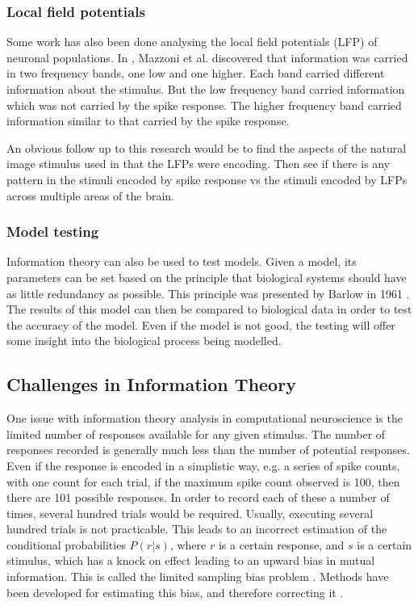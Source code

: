 \documentclass[a4paper,12pt]{article}
\theoremstyle{definition}
\begin{document}
\subsubsection*{Local field potentials}
 Some work has also been done analysing the local field potentials (LFP) of neuronal populations. In \cite{lfps}, Mazzoni et al. discovered that information was carried in two frequency bands, one low and one higher. Each band carried different information about the stimulus. But the low frequency band carried information which was not carried by the spike response. The higher frequency band carried information similar to that carried by the spike response.

 An obvious follow up to this research would be to find the aspects of the natural image stimulus used in \cite{lfps} that the LFPs were encoding. Then see if there is any pattern in the stimuli encoded by spike response vs the stimuli encoded by LFPs across multiple areas of the brain.

\subsubsection*{Model testing}
 Information theory can also be used to test models. Given a model, its parameters can be set based on the principle that biological systems should have as little redundancy as possible. This principle was presented by Barlow in 1961 \cite{barlow}. The results of this model can then be compared to biological data in order to test the accuracy of the model. Even if the model is not good, the testing will offer some insight into the biological process being modelled.

\subsection*{Challenges in Information Theory}
 One issue with information theory analysis in computational neuroscience is the limited number of responses available for any given stimulus. The number of responses recorded is generally much less than the number of potential responses. Even if the response is encoded in a simplistic way, e.g. a series of spike counts, with one count for each trial, if the maximum spike count observed is 100, then there are 101 possible responses. In order to record each of these a number of times, several hundred trials would be required. Usually, executing several hundred trials is not practicable. This leads to an incorrect estimation of the conditional probabilities $P (r|s)$, where $r$ is a certain response, and $s$ is a certain stimulus, which has a knock on effect leading to an upward bias in mutual information. This is called the limited sampling bias problem \cite{analytical}. Methods have been developed for estimating this bias, and therefore correcting it \cite{correcting}.
\end{document}

